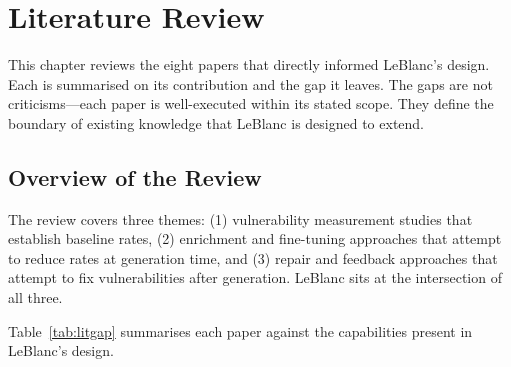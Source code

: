 \documentclass[12pt,a4paper]{report}
\begin{document}
\chapter{Literature Review}
\label{ch:literature}

This chapter reviews the eight papers that directly informed LeBlanc's design.
Each is summarised on its contribution and the gap it leaves. The gaps are not
criticisms---each paper is well-executed within its stated scope. They define the
boundary of existing knowledge that LeBlanc is designed to extend.

\section{Overview of the Review}
\label{sec:litoverview}

The review covers three themes: (1) vulnerability measurement studies that
establish baseline rates, (2) enrichment and fine-tuning approaches that attempt
to reduce rates at generation time, and (3) repair and feedback approaches that
attempt to fix vulnerabilities after generation. LeBlanc sits at the intersection
of all three.

Table~\ref{tab:litgap} summarises each paper against the capabilities present in
LeBlanc's design.
\end{document}

